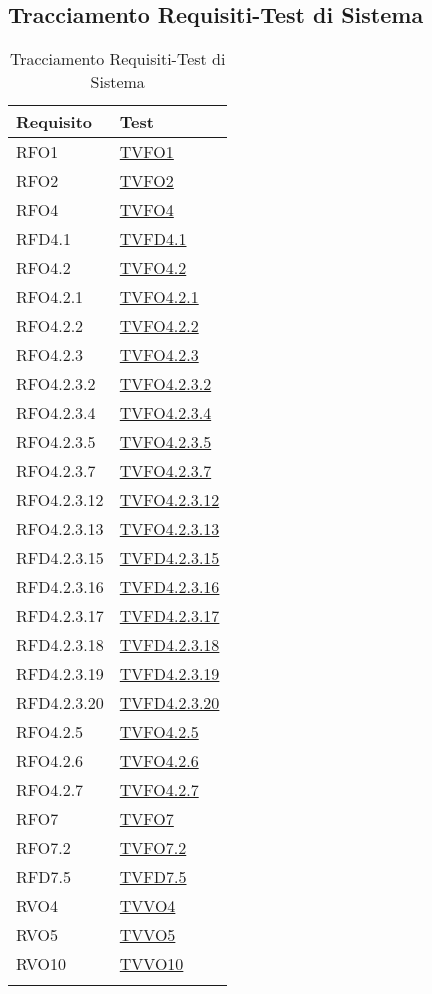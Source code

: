 \subsection{Tracciamento Requisiti-Test di Sistema}
\normalsize
\begin{longtable}{|>{\centering}m{5cm}|m{5cm}<{\centering}|}
\hline 
\textbf{Requisito} & \textbf{Test}\\
\hline
\endhead
RFO1 & \hyperlink{TVFO1}{TVFO1}\\ \hline
RFO2 & \hyperlink{TVFO2}{TVFO2}\\ \hline
RFO4 & \hyperlink{TVFO4}{TVFO4}\\ \hline
RFD4.1 & \hyperlink{TVFD4.1}{TVFD4.1}\\ \hline
RFO4.2 & \hyperlink{TVFO4.2}{TVFO4.2}\\ \hline
RFO4.2.1 & \hyperlink{TVFO4.2.1}{TVFO4.2.1}\\ \hline
RFO4.2.2 & \hyperlink{TVFO4.2.2}{TVFO4.2.2}\\ \hline
RFO4.2.3 & \hyperlink{TVFO4.2.3}{TVFO4.2.3}\\ \hline
RFO4.2.3.2 & \hyperlink{TVFO4.2.3.2}{TVFO4.2.3.2}\\ \hline
RFO4.2.3.4 & \hyperlink{TVFO4.2.3.4}{TVFO4.2.3.4}\\ \hline
RFO4.2.3.5 & \hyperlink{TVFO4.2.3.5}{TVFO4.2.3.5}\\ \hline
RFO4.2.3.7 & \hyperlink{TVFO4.2.3.7}{TVFO4.2.3.7}\\ \hline
RFO4.2.3.12 & \hyperlink{TVFO4.2.3.12}{TVFO4.2.3.12}\\ \hline
RFO4.2.3.13 & \hyperlink{TVFO4.2.3.13}{TVFO4.2.3.13}\\ \hline
RFD4.2.3.15 & \hyperlink{TVFD4.2.3.15}{TVFD4.2.3.15}\\ \hline
RFD4.2.3.16 & \hyperlink{TVFD4.2.3.16}{TVFD4.2.3.16}\\ \hline
RFD4.2.3.17 & \hyperlink{TVFD4.2.3.17}{TVFD4.2.3.17}\\ \hline
RFD4.2.3.18 & \hyperlink{TVFD4.2.3.18}{TVFD4.2.3.18}\\ \hline
RFD4.2.3.19 & \hyperlink{TVFD4.2.3.19}{TVFD4.2.3.19}\\ \hline
RFD4.2.3.20 & \hyperlink{TVFD4.2.3.20}{TVFD4.2.3.20}\\ \hline
RFO4.2.5 & \hyperlink{TVFO4.2.5}{TVFO4.2.5}\\ \hline
RFO4.2.6 & \hyperlink{TVFO4.2.6}{TVFO4.2.6}\\ \hline
RFO4.2.7 & \hyperlink{TVFO4.2.7}{TVFO4.2.7}\\ \hline
RFO7 & \hyperlink{TVFO7}{TVFO7}\\ \hline
RFO7.2 & \hyperlink{TVFO7.2}{TVFO7.2}\\ \hline
RFD7.5 & \hyperlink{TVFD7.5}{TVFD7.5}\\ \hline
RVO4 & \hyperlink{TVVO4}{TVVO4}\\ \hline
RVO5 & \hyperlink{TVVO5}{TVVO5}\\ \hline
RVO10 & \hyperlink{TVVO10}{TVVO10}\\ \hline
\caption[Tracciamento Requisiti-Test di Sistema]{Tracciamento Requisiti-Test di Sistema}
\label{tabella:requi-tv}
\end{longtable}
\clearpage
